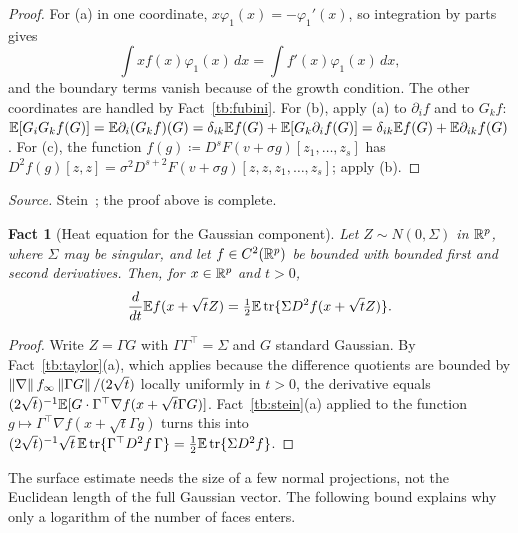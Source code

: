 \documentclass[11pt,letterpaper]{article}
\theoremstyle{plain}
\newtheorem{fact}{Fact}[section]
\begin{document}
\begin{proof}
For (a) in one coordinate, \(x\varphi_1(x)=-\varphi_1'(x)\), so integration by
parts gives
\[\int xf(x)\varphi_1(x)\,dx=\int f'(x)\varphi_1(x)\,dx,\]
and the boundary terms vanish because of the growth condition. The other coordinates
are handled by Fact~\ref{tb:fubini}. For (b), apply (a) to \(\partial_if\) and
to \(G_kf\): \(\mathbb E[G_iG_kf(G)]=\mathbb E\partial_i(G_kf)(G)=\delta_{ik}\mathbb E f(G)
+\mathbb E[G_k\partial_if(G)]=\delta_{ik}\mathbb E f(G)+\mathbb E\partial_{ik}f(G)\). For (c), the
function \(f(g)\coloneqq D^sF(v+\sigma g)[z_1,\ldots,z_s]\) has
\(D^2f(g)[z,z]=\sigma^2D^{s+2}F(v+\sigma g)[z,z,z_1,\ldots,z_s]\); apply (b).
\end{proof}

\emph{Source.} Stein~; the proof above is complete.

\begin{fact}[Heat equation for the Gaussian component]\label{tb:heat}
Let \(Z\sim N(0,\Sigma)\) in \(\mathbb R^p\), where \(\Sigma\) may be singular, and
let \(f\in C^2(\mathbb R^p)\) be bounded with bounded first and second derivatives.
Then, for \(x\in\mathbb R^p\) and \(t>0\),
\[
 \frac d{dt}\mathbb E f(x+\sqrt t Z)
 =\tfrac12\mathbb E\operatorname{tr}\{\Sigma D^2f(x+\sqrt t Z)\}.
\]
\end{fact}

\begin{proof}
Write \(Z=\Gamma G\) with \(\Gamma\Gamma^\top=\Sigma\) and \(G\) standard
Gaussian. By Fact~\ref{tb:taylor}(a), which applies because the difference
quotients are bounded by \(\left\lVert\nabla\right\rVert f_\infty\left\lVert\Gamma G\right\rVert/(2\sqrt t)\)
locally uniformly in \(t>0\), the derivative equals
\((2\sqrt t)^{-1}\mathbb E[G\cdot\Gamma^\top\nabla f(x+\sqrt t\Gamma G)]\).
Fact~\ref{tb:stein}(a) applied to the function \(g\mapsto
\Gamma^\top\nabla f(x+\sqrt t\Gamma g)\) turns this into
\((2\sqrt t)^{-1}\sqrt t\,\mathbb E\operatorname{tr}\{\Gamma^\top D^2f\,\Gamma\}
=\frac12\mathbb E\operatorname{tr}\{\Sigma D^2f\}\).
\end{proof}


The surface estimate needs the size of a few normal projections,
not the Euclidean length of the full Gaussian vector. The following
bound explains why only a logarithm of the number of faces enters.
\end{document}
